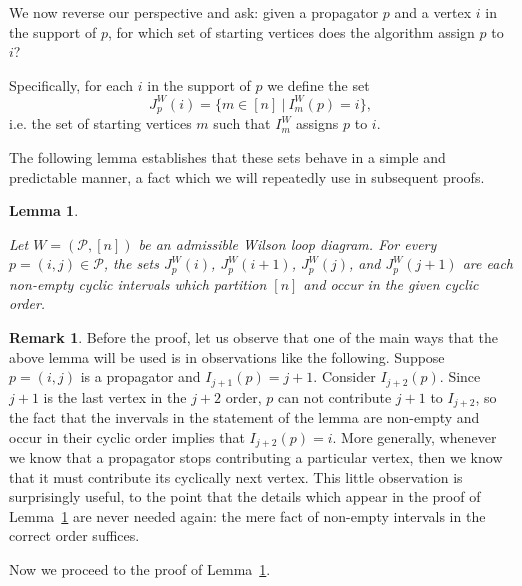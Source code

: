 \documentclass[11pt]{article}
\newcommand{\cP}{\mathcal{P}}
\newtheorem{lem}[thm]{Lemma}
\theoremstyle{remark}
\theoremstyle{definition}
\newtheorem{rmk}[thm]{Remark}
\begin{document}
We now reverse our perspective and ask: given a propagator $p$ and a vertex $i$ in the support of $p$, for which set of starting vertices does the algorithm assign $p$ to $i$? 






Specifically, for each $i$ in the support of $p$ we define the set
\[J_p^{W}(i) = \{m \in [n] \ | \ I^{W}_m(p) = i \},\]
i.e. the set of starting vertices $m$ such that $I_m^{W}$ assigns $p$ to $i$. 

The following lemma establishes that these sets behave in a simple and predictable manner, a fact which we will repeatedly use in subsequent proofs.




\begin{lem} \label{vertex cyclic int lem}
  
Let $W = (\cP,[n])$ be an admissible Wilson loop diagram.  For every $p = (i,j) \in \cP$, the sets $J_p^{W}(i)$, $J_p^{W}(i+1)$, $J_p^{W}(j)$, and $J_p^{W}(j+1)$ are each non-empty cyclic intervals which partition $[n]$ and occur in the given cyclic order.
\end{lem}

\begin{rmk}\label{rmk cyclic}
  Before the proof, let us observe that one of the main ways that the above lemma will be used is in observations like the following.  Suppose $p=(i,j)$ is a propagator and $I_{j+1}(p) = j+1$.  Consider $I_{j+2}(p)$.  Since $j+1$ is the last vertex in the $j+2$ order, $p$ can not contribute $j+1$ to $I_{j+2}$, so the fact that the invervals in the statement of the lemma are non-empty and occur in their cyclic order implies that $I_{j+2}(p)=i$.  More generally, whenever we know that a propagator stops contributing a particular vertex, then we know that it must contribute its cyclically next vertex.  This little observation is surprisingly useful, to the point that the details which appear in the proof of Lemma~\ref{vertex cyclic int lem} are never needed again: the mere fact of non-empty intervals in the correct order suffices.
\end{rmk}
  
Now we proceed to the proof of Lemma~\ref{vertex cyclic int lem}.
\end{document}
